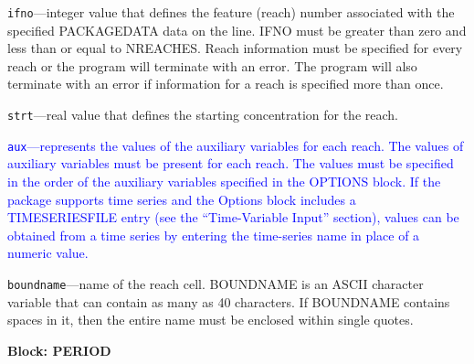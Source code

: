 \begin{description}
\item \texttt{ifno}---integer value that defines the feature (reach) number associated with the specified PACKAGEDATA data on the line. IFNO must be greater than zero and less than or equal to NREACHES. Reach information must be specified for every reach or the program will terminate with an error.  The program will also terminate with an error if information for a reach is specified more than once.

\item \texttt{strt}---real value that defines the starting concentration for the reach.

\item \textcolor{blue}{\texttt{aux}---represents the values of the auxiliary variables for each reach. The values of auxiliary variables must be present for each reach. The values must be specified in the order of the auxiliary variables specified in the OPTIONS block.  If the package supports time series and the Options block includes a TIMESERIESFILE entry (see the ``Time-Variable Input'' section), values can be obtained from a time series by entering the time-series name in place of a numeric value.}

\item \texttt{boundname}---name of the reach cell.  BOUNDNAME is an ASCII character variable that can contain as many as 40 characters.  If BOUNDNAME contains spaces in it, then the entire name must be enclosed within single quotes.

\end{description}
\item \textbf{Block: PERIOD}


